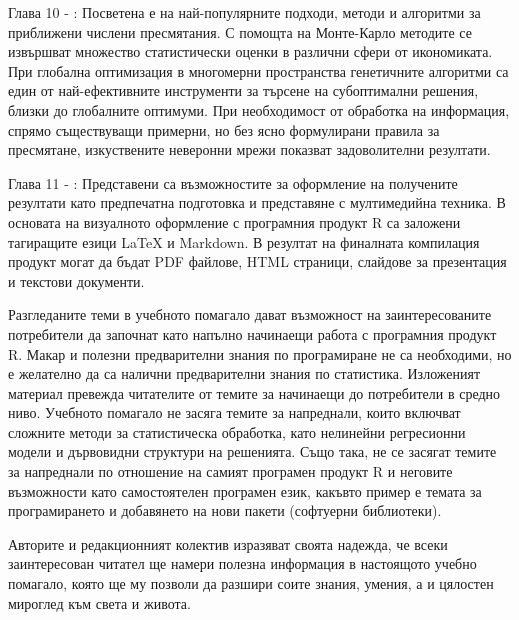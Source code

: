 Глава 10 - : Посветена е на най-популярните подходи, методи и алгоритми за приближени числени пресмятания. С помощта на Монте-Карло методите се извършват множество статистически оценки в различни сфери от икономиката. При глобална оптимизация в многомерни пространства генетичните алгоритми са един от най-ефективните инструменти за търсене на субоптимални решения, близки до глобалните оптимуми. При необходимост от обработка на информация, спрямо съществуващи примерни, но без ясно формулирани правила за пресмятане, изкуствените неверонни мрежи показват задоволителни резултати. 

Глава 11 - : Представени са възможностите за оформление на получените резултати като предпечатна подготовка и представяне с мултимедийна техника. В основата на визуалното оформление с програмния продукт R са заложени тагиращите езици LaTeX и Markdown. В резултат на финалната компилация продукт могат да бъдат PDF файлове, HTML страници, слайдове за презентация и текстови документи. 

Разгледаните теми в учебното помагало дават възможност на заинтересованите потребители да започнат като напълно начинаещи работа с програмния продукт R. Макар и полезни предварителни знания по програмиране не са необходими, но е желателно да са налични предварителни знания по статистика. Изложеният материал превежда читателите от темите за начинаещи до потребители в средно ниво. Учебното помагало не засяга темите за напреднали, които включват сложните методи за статистическа обработка, като нелинейни регресионни модели и дървовидни структури на решенията. Също така, не се засягат темите за напреднали по отношение на самият програмен продукт R и неговите възможности като самостоятелен програмен език, какъвто пример е темата за програмирането и добавянето на нови пакети (софтуерни библиотеки). 

Авторите и редакционният колектив изразяват своята надежда, че всеки заинтересован читател ще намери полезна информация в настоящото учебно помагало, която ще му позволи да разшири соите знания, умения, а и цялостен мироглед към света и живота. 


